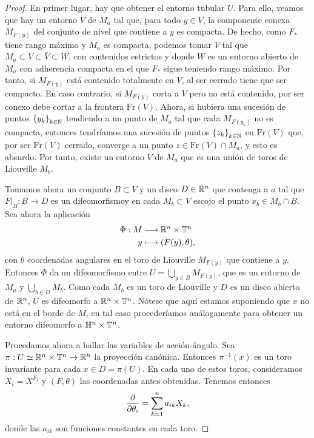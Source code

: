 \begin{proof}
  En primer lugar, hay que obtener el entorno tubular $U$. Para ello, veamos que hay un entorno $V$ de $M_a$ tal que, para todo $y\in V$, la componente conexa $M_{F(y)}$ del conjunto de nivel que contiene a $y$ es compacta. De hecho, como $F_*$ tiene rango máximo y $M_a$ es compacta, podemos tomar $V$ tal que $M_a\subset V \subset \bar{V} \subset W$, con contenidos estrictos y donde $W$ es un entorno abierto de $M_a$ con adherencia compacta en el que $F_*$ sigue teniendo rango máximo. Por tanto, si $M_{F(y)}$ está contenido totalmente en $V$, al ser cerrado tiene que ser compacto. En caso contrario, si $M_{F(y)}$ corta a $V$ pero no está contenido, por ser conexo debe cortar a la frontera $\mathrm{Fr}(V)$. Ahora, si hubiera una sucesión de puntos $\left\{ y_k \right\}_{k\in \mathbb{N}}$ tendiendo a un punto de $M_a$ tal que cada $M_{F(y_k)}$ no es compacta, entonces tendríamos una sucesión de puntos $\left\{ z_k \right\}_{k\in \mathbb{N}}$ en $\mathrm{Fr}(V)$ que, por ser $\mathrm{Fr}(V)$ cerrado, converge a un punto $z\in \mathrm{Fr}(V) \cap M_a$, y esto es absurdo. Por tanto, existe un entorno $V$ de $M_a$ que es una unión de toros de Liouville $M_b$. 

  Tomamos ahora un conjunto $B\subset V$ y un disco $D\in \mathbb{R}^n$ que contenga a $a$ tal que $\left. F\right|_{B}:B\rightarrow D$ es un difeomorfismoy en cada $M_b\subset V$ escojo el punto $x_b\in M_b\cap B$. Sea ahora la aplicación 
  \begin{align*}
    \Phi :M&\longrightarrow \mathbb{R}^n\times \mathbb{T}^n\\ 
      y &\longmapsto (F(y),\theta),
    \end{align*}
    con $\theta$ coordenadas angulares en el toro de Liouville $M_{F(y)}$ que contiene a $y$. Entonces $\Phi$ da un difeomorfismo entre $U=\bigcup_{y\in B}M_{F(y)}$, que es un entorno de $M_a$ y $\bigcup_{b\in D}M_b$. Como cada $M_b$ es un toro de Liouville y $D$ es un disco abierto de $\mathbb{R}^n$, $U$ es difeomorfo a $\mathbb{R}^n\times \mathbb{T}^n$.
  Nótese que aquí estamos suponiendo que $x$ no está en el borde de $M$, en tal caso procederíamos análogamente para obtener un entorno difeomorfo a $\mathbb{H}^n \times \mathbb{T}^n$.

 Procedamos ahora a hallar las variables de acción-ángulo. Sea $\pi:U\simeq \mathbb{R}^n \times \mathbb{T}^n \rightarrow \mathbb{R}^n$ la proyección canónica. Entonces $\pi^{-1}(x)$ es un toro invariante para cada $x \in D=\pi(U)$. En cada uno de estos toros, consideramos $X_i=X^{F_i}$ y $(F,\theta)$ las coordenadas antes obtenidas. Tenemos entonces
\[
  \frac{\partial}{\partial \theta_i} = \sum_{k=1}^n a_{ik}X_k,
\]
donde las $a_{ik}$ son funciones constantes en cada toro.


\end{proof}
